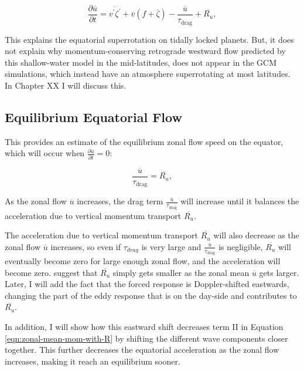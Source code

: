 \begin{equation}
  \frac { \partial \overline { u } } { \partial t } = \overline { v ^ { \prime } \zeta ^ { \prime } } + \overline { v } ( f + \overline { \zeta } ) - \frac { \overline { u } } { \tau _ { \mathrm { drag } } } + \overline { R _ { u } },
\end{equation}

This explains the equatorial superrotation on tidally locked planets. But, it does not explain why momentum-conserving retrograde westward flow predicted by this shallow-water model in the mid-latitudes, does not appear in the GCM simulations, which instead have an atmosphere superrotating at most latitudes. In Chapter XX I will discuss this.

\subsection{Equilibrium Equatorial Flow}

This provides an estimate of the equilibrium zonal flow speed on the equator, which will occur when $\frac { \partial \overline { u } } { \partial t }=0$:

\begin{equation}
  \frac { \overline { u } } { \tau _ { \mathrm { drag } } } = \overline { R _ { u } },
\end{equation}

As the zonal flow $\overline { u }$ increases, the drag term $\frac { \overline { u } } { \tau _ { \mathrm { drag } } }$ will increase until it balances the acceleration due to vertical momentum transport $\overline { R _ { u } }$.

The acceleration due to vertical momentum transport $\overline { R _ { u } }$ will also decrease as the zonal flow $\overline { u }$ increases, so even if $\tau_{drag}$ is very large and  $\frac { \overline { u } } { \tau _ { \mathrm { drag } } }$ is negligible, $\overline { R _ { u } }$ will eventually become zero for large enough zonal flow, and the acceleration will become zero. \citet{showman2011superrotation} suggest that $\overline { R _ { u } }$ simply gets smaller as the zonal mean $\overline{u}$ gets larger. Later, I will add the fact that the forced response is Doppler-shifted eastwards, changing the part of the eddy response that is on the day-side and contributes to $\overline { R _ { u } }$.

In addition, I will show how this eastward shift decreases term II in Equation \ref{eqn:zonal-mean-mom-with-R} by shifting the different wave components closer together. This further decreases the equatorial acceleration as the zonal flow increases, making it reach an equilibrium sooner.


